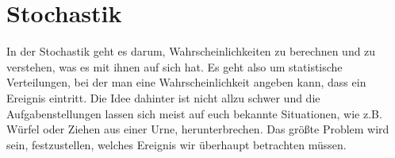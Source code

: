 \chapter{Stochastik}
	In der Stochastik geht es darum, Wahrscheinlichkeiten zu berechnen und zu
	verstehen, was es mit ihnen auf sich hat. Es geht also um statistische
	Verteilungen, bei der man eine Wahrscheinlichkeit angeben kann, dass ein
	Ereignis eintritt. Die Idee dahinter ist nicht allzu schwer und die
	Aufgabenstellungen lassen sich meist auf euch bekannte Situationen, wie z.B.
	Würfel oder Ziehen aus einer Urne, herunterbrechen. Das größte Problem wird
	sein, festzustellen, welches Ereignis wir überhaupt betrachten müssen.

	

	

	

	

	

	

	